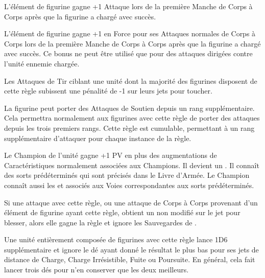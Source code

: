 L'élément de figurine gagne +1 Attaque lors de la première Manche de Corps à Corps après que la figurine a chargé avec succès.


L'élément de figurine gagne +1 en Force pour ses Attaques normales de Corps à Corps lors de la première Manche de Corps à Corps après que la figurine a chargé avec succès. Ce bonus ne peut être utilisé que pour des attaques dirigées contre l'unité ennemie chargée.


Les Attaques de Tir ciblant une unité dont la majorité des figurines disposent de cette règle subissent une pénalité de -1 sur leurs jets pour toucher.


La figurine peut porter des Attaques de Soutien depuis un rang supplémentaire. Cela permettra normalement aux figurines avec cette règle de porter des attaques depuis les trois premiers rangs. Cette règle est cumulable, permettant à un rang supplémentaire d'attaquer pour chaque instance de la règle.


Le Champion de l'unité gagne +1 PV en plus des augmentations de Caractéristiques normalement associées aux Champions. Il devient un \wizardapprentice{}. Il connaît des sorts prédéterminés qui sont précisés dans le Livre d'Armée. Le Champion connaît aussi les \traitspells{} et \attributespells{} associés aux Voies correspondantes aux sorts prédéterminés.


Si une attaque avec cette règle, ou une attaque de Corps à Corps provenant d'un élément de figurine ayant cette règle, obtient un  non modifié sur le jet pour blesser, alors elle gagne la règle  et ignore les Sauvegardes de \regeneration{}.


Une unité entièrement composée de figurines avec cette règle lance 1D6 supplémentaire et ignore le dé ayant donné le résultat le plus bas pour ses jets de distance de Charge, Charge Irrésistible, Fuite ou Poursuite. En général, cela fait lancer trois dés pour n'en conserver que les deux meilleurs.


